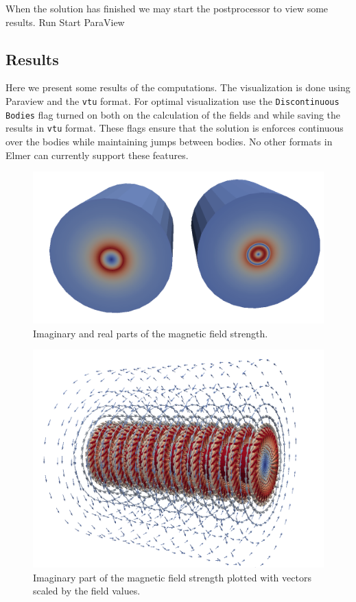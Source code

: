 When the solution has finished we may start the postprocessor to view some results.
\ttbegin
Run
  Start ParaView
\ttend


\subsection*{Results}

Here we present some results of the computations. The visualization is done using Paraview and the \texttt{vtu} format.
For optimal visualization use the \texttt{Discontinuous Bodies} flag turned on both on the calculation of the fields
and while saving the results in \texttt{vtu} format. 
These flags ensure that the solution is enforces continuous over the
bodies while maintaining jumps between bodies. 
No other formats in Elmer can currently support these features.

\begin{figure}[h]
\centering
\includegraphics[width=120 mm]{WireBfieldReIm}
\caption{Imaginary and real parts of the magnetic field strength.}\label{fg:BfieldWire}
\end{figure}  

\begin{figure}[h]
\centering
\includegraphics[width=120 mm]{WireBfieldImVectors}
\caption{Imaginary part of the magnetic field strength plotted with vectors scaled by the field values.}
\label{fg:BfieldWireVectors}
\end{figure}  


